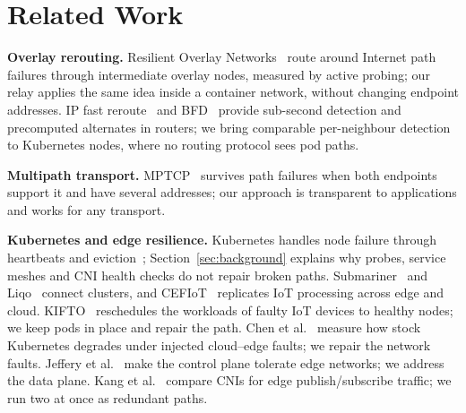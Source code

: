 \documentclass[conference,compsoc]{IEEEtran}
\begin{document}
\section{Related Work}
\label{sec:related}

\textbf{Overlay rerouting.} Resilient Overlay Networks~\cite{andersen2001ron} route
around Internet path failures through intermediate overlay nodes, measured by active
probing; our relay applies the same idea inside a container network, without changing
endpoint addresses. IP fast reroute~\cite{rfc5714frr} and BFD~\cite{rfc5880bfd}
provide sub-second detection and precomputed alternates in routers; we bring comparable
per-neighbour detection to Kubernetes nodes, where no routing protocol sees pod paths.

\textbf{Multipath transport.} MPTCP~\cite{rfc8684mptcp} survives path failures when
both endpoints support it and have several addresses; our approach is transparent to
applications and works for any transport.

\textbf{Kubernetes and edge resilience.} Kubernetes handles node failure through
heartbeats and eviction~\cite{k8snodelifecycle}; Section~\ref{sec:background}
explains why probes, service meshes and CNI health checks do not repair broken paths.
Submariner~\cite{submariner} and Liqo~\cite{iorio2023liqo} connect clusters, and
CEFIoT~\cite{javed2018cefiot} replicates IoT processing across edge and cloud.
KIFTO~\cite{costa2026kifto} reschedules the workloads of faulty IoT devices to healthy
nodes; we keep pods in place and repair the path. Chen et
al.~\cite{chen2026k8sresilience} measure how stock Kubernetes degrades under injected
cloud--edge faults; we repair the network faults. Jeffery et
al.~\cite{jeffery2021rearchitecting} make the control plane tolerate edge networks; we
address the data plane. Kang et al.~\cite{kang2021cni} compare CNIs for edge
publish/subscribe traffic; we run two at once as redundant paths.

\end{document}
